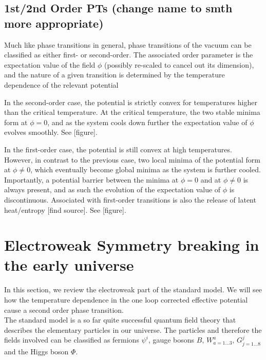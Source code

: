 \documentclass{article}
\numberwithin{equation}{section}
\begin{document}
\subsection*{1st/2nd Order PTs (change name to smth more appropriate)}

Much like phase transitions in general, phase transitions of the vacuum can be classified as either first- or second-order. The associated order parameter is the expectation value of the field $\phi$ (possibly re-scaled to cancel out its dimension), and the nature of a given transition is determined by the temperature dependence of the relevant potential

In the second-order case, the potential is strictly convex for temperatures higher than the critical temperature. At the critical temperature, the two stable minima form at $\phi=0$, and as the system cools down further the expectation value of $\phi$ evolves smoothly. See [figure].

In the first-order case, the potential is still convex at high temperatures. However, in contrast to the previous case, two local minima of the potential form at $\phi\neq0$, which eventually become global minima as the system is further cooled. Importantly, a potential barrier between the minima at $\phi=0$ and at $\phi\neq0$ is always present, and as such the evolution of the expectation value of $\phi$ is discontinuous. Associated with first-order transitions is also the release of latent heat/entropy [find source]. See [figure].


\section{Electroweak Symmetry breaking in the early universe}

In this section, we review the electroweak part of the standard model. We will see how the temperature dependence in the one loop corrected effective potential cause a second order phase transition. \\
\hspace{1cm}
The standard model is a so far quite successful quantum field theory that describes the elementary particles in our universe. 
The particles and therefore the fields involved can be classified as fermions $\psi^{i}$, gauge bosons $B, \,W^{a}_{a = 1\dots 3}, \, G^j_{j = 1\dots 8}$ and the Higgs boson $\Phi$. 
\end{document}
